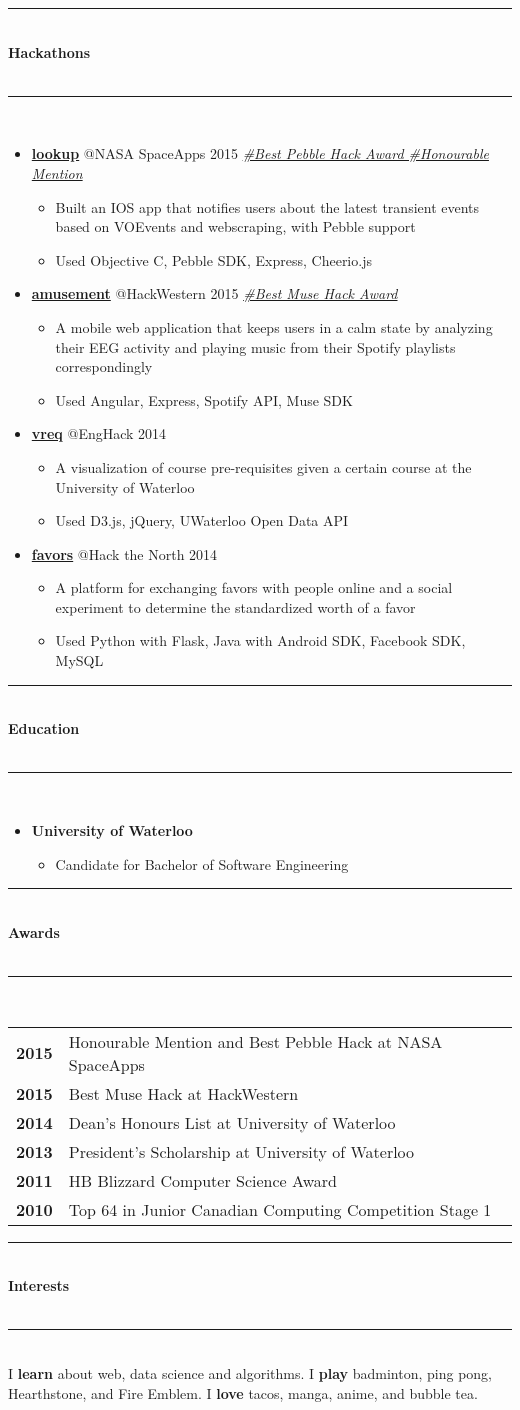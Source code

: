 \documentclass[10pt]{article}
\makeatletter
\newcommand{\cvsectiontitle}[1]{%
	\rule{\linewidth}{0.2mm}\\%
		{\large\indent\textbf{#1}}\\%
	\\[-6.5mm]\rule{\linewidth}{0.2mm}\\[2mm]%
	}
\newcommand{\cvcompany}[2]{\textbf{#1}\hspace{\stretch{3}}{#2}}
\newcommand{\cvhackathonproject}[4]{\href{#2}{\textbf{#1}} @{#3} \color{BrickRed}\textit{#4} \color{Black}}
\newcommand{\cvaward}[2]{\textbf{#1} & {#2}}
\newcommand{\cvsublevel}[1]{\begin{itemize}[leftmargin=0.5cm] #1\end{itemize}}
\newcommand{\cvsubbullet}[1]{\vspace{-1mm}\item #1}
\makeatother
\begin{document}
\cvsectiontitle{Hackathons}
\vspace{-0.8cm}
\begin{itemize}[leftmargin=0.5cm]
\item \cvhackathonproject{lookup}{https://github.com/Clemmy/lookup}{NASA SpaceApps 2015}{\href{https://twitter.com/SpaceAppsTO/status/587444439276191744}{\#Best Pebble Hack Award \#Honourable Mention}}\cvsublevel{
	\cvsubbullet{Built an IOS app that notifies users about the latest transient events based on VOEvents and webscraping, with Pebble support}
	\cvsubbullet{Used Objective C, Pebble SDK, Express, Cheerio.js}
}
\item \cvhackathonproject{amusement}{https://github.com/Clemmy/amusement}{HackWestern 2015}{\href{http://challengepost.com/software/amusement-um9im}{\#Best Muse Hack Award}}\cvsublevel{
	\cvsubbullet{A mobile web application that keeps users in a calm state by analyzing their EEG activity and playing music from their Spotify playlists correspondingly}
	\cvsubbullet{Used Angular, Express, Spotify API, Muse SDK}
}
\item \cvhackathonproject{vreq}{https://github.com/jasonf7/VReq}{EngHack 2014}{}\cvsublevel{
	\cvsubbullet{A visualization of course pre-requisites given a certain course at the University of Waterloo}
	\cvsubbullet{Used D3.js, jQuery, UWaterloo Open Data API}
}
\item \cvhackathonproject{favors}{https://github.com/raywan/favors}{Hack the North 2014}{}\cvsublevel{
	\cvsubbullet{A platform for exchanging favors with people online and a social experiment to determine the standardized worth of a favor}
	\cvsubbullet{Used Python with Flask, Java with Android SDK, Facebook SDK, MySQL}
}
\end{itemize}

\vspace{-2.5mm}
\cvsectiontitle{Education}
\vspace{-0.8cm}
\begin{itemize}[leftmargin=0.5cm]
\item \cvcompany{University of Waterloo}{September 2013 - May 2018}\cvsublevel{
	\cvsubbullet{Candidate for Bachelor of Software Engineering}
}
\end{itemize}

\vspace{-2.5mm}
\cvsectiontitle{Awards}
\begin{tabular}{ c l }
	\cvaward{2015}{Honourable Mention and Best Pebble Hack at NASA SpaceApps} \\
	\cvaward{2015}{Best Muse Hack at HackWestern} \\
	\cvaward{2014}{Dean's Honours List at University of Waterloo} \\
	\cvaward{2013}{President's Scholarship at University of Waterloo} \\
	\cvaward{2011}{HB Blizzard Computer Science Award} \\
	\cvaward{2010}{Top 64 in Junior Canadian Computing Competition Stage 1}
\end{tabular}

\vspace{2mm}
\cvsectiontitle{Interests}
I \textbf{learn} about web, data science and algorithms.
I \textbf{play} badminton, ping pong, Hearthstone, and Fire Emblem.
I \textbf{love} tacos, manga, anime, and bubble tea.
\end{document}
